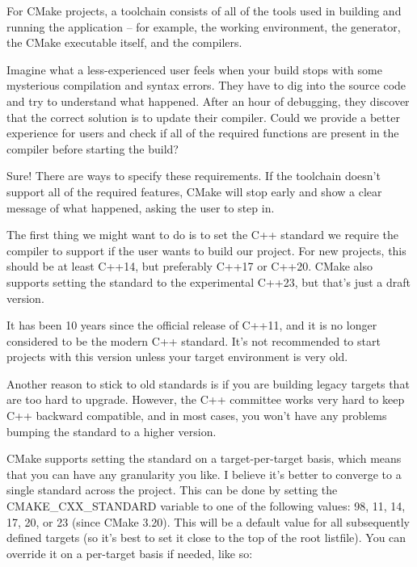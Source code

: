 
For CMake projects, a toolchain consists of all of the tools used in building and running the application – for example, the working environment, the generator, the CMake executable itself, and the compilers.

Imagine what a less-experienced user feels when your build stops with some mysterious compilation and syntax errors. They have to dig into the source code and try to understand what happened. After an hour of debugging, they discover that the correct solution is to update their compiler. Could we provide a better experience for users and check if all of the required functions are present in the compiler before starting the build?

Sure! There are ways to specify these requirements. If the toolchain doesn't support all of the required features, CMake will stop early and show a clear message of what happened, asking the user to step in.


The first thing we might want to do is to set the C++ standard we require the compiler to support if the user wants to build our project. For new projects, this should be at least C++14, but preferably C++17 or C++20. CMake also supports setting the standard to the experimental C++23, but that's just a draft version.

\begin{tcolorbox}[colback=blue!5!white,colframe=blue!75!black,title=Note]
It has been 10 years since the official release of C++11, and it is no longer considered to be the modern C++ standard. It's not recommended to start projects with this version unless your target environment is very old.

Another reason to stick to old standards is if you are building legacy targets that are too hard to upgrade. However, the C++ committee works very hard to keep C++ backward compatible, and in most cases, you won't have any problems bumping the standard to a higher version.
\end{tcolorbox}

CMake supports setting the standard on a target-per-target basis, which means that you can have any granularity you like. I believe it's better to converge to a single standard across the project. This can be done by setting the CMAKE\_CXX\_STANDARD variable to one of the following values: 98, 11, 14, 17, 20, or 23 (since CMake 3.20). This will be a default value for all subsequently defined targets (so it's best to set it close to the top of the root listfile). You can override it on a per-target basis if needed, like so:


